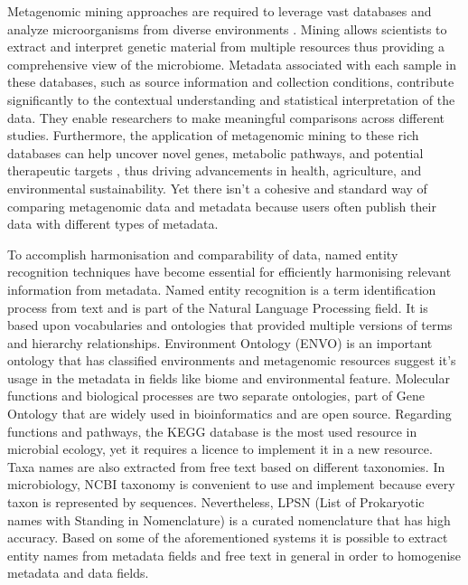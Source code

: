 Metagenomic mining approaches are required to leverage vast databases and analyze
microorganisms from diverse environments \parencite{delmont2011metagenomic}.
Mining allows scientists to extract and interpret genetic material 
from multiple resources thus providing a comprehensive view of the microbiome.
Metadata associated with each sample in these databases, such as source information and collection conditions,
contribute significantly to the contextual understanding and statistical interpretation of the data.
They enable researchers to make meaningful comparisons across different studies.
Furthermore, the application of metagenomic mining to these rich databases can help
uncover novel genes, metabolic pathways, and potential therapeutic targets \parencite{ma2023a-genomic},
thus driving advancements in health, agriculture, and environmental sustainability.
Yet there isn't a cohesive and standard way of comparing metagenomic data and 
metadata because users often publish their data with different types of metadata.

To accomplish harmonisation and comparability of data, named entity recognition techniques have become essential for
efficiently harmonising relevant information from metadata.
Named entity recognition is a term identification process from text 
and is part of the Natural Language Processing field. It is based upon
vocabularies and ontologies that provided multiple versions of terms and 
hierarchy relationships. Environment Ontology (ENVO) \parencite{buttigieg2016environment} 
is an important ontology that has classified environments and metagenomic 
resources suggest it's usage in the metadata in fields like biome and 
environmental feature. Molecular functions and biological processes are two separate 
ontologies, part of Gene Ontology \parencite{ashburner2000gene, gene2021gene} that
are widely used in bioinformatics and are open source. 
Regarding functions and pathways, the KEGG database \parencite{kanehisa2000kegg} is the most used resource
in microbial ecology, yet it requires a licence to implement it in a new resource.
Taxa names are also extracted from free text based on different taxonomies. In microbiology,
NCBI taxonomy \parencite{schoch2020ncbi} is convenient to use and implement because every taxon 
is represented by sequences. Nevertheless, LPSN (List of Prokaryotic names with Standing in Nomenclature) \parencite{parte2020list}
is a curated nomenclature that has high accuracy. Based on some of the aforementioned 
systems it is possible to extract entity names from metadata fields and free text in general 
in order to homogenise metadata and data fields.


